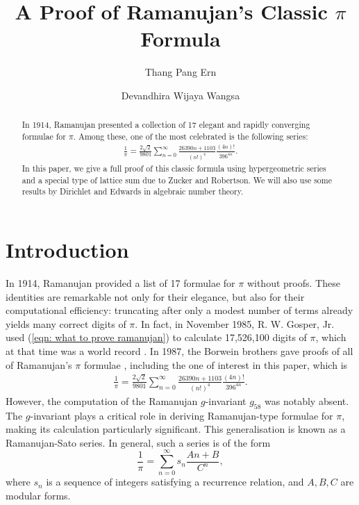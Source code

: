 \documentclass[11pt]{amsart}
\title[A Proof of Ramanujan's Classic $\pi$ Formula]%
 {A Proof of Ramanujan's Classic $\pi$ Formula}
\author{Thang Pang Ern \orcidlink{0009-0005-3447-4188}}
\author{Devandhira Wijaya Wangsa}
\theoremstyle{definition}
\numberwithin{theorem}{section}
\begin{document}
\maketitle
\begin{abstract}
In 1914, Ramanujan presented a collection of 17 elegant and rapidly converging formulae for $\pi$. Among these, one of the most celebrated is the following series: \begin{align*}
    \frac{1}{\pi}=\frac{2\sqrt{2}}{9801}\sum_{n=0}^{\infty}\frac{26390n+1103}{\left(n!\right)^4} \frac{\left(4n\right)!}{396^{4n}}.
\end{align*}
In this paper, we give a full proof of this classic formula using hypergeometric series and a special type of lattice sum due to Zucker and Robertson. We will also use some results by Dirichlet and Edwards in algebraic number theory.
\end{abstract}
\section{Introduction}
In 1914, Ramanujan provided a list of 17 formulae for $\pi$ \cite{ramanujan modular} without proofs. These identities are remarkable not only for their elegance, but also for their computational efficiency: truncating after only a modest number of terms already yields many correct digits of $\pi$. In fact, in November 1985, R. W. Gosper, Jr. used (\ref{eqn: what to prove ramanujan}) to calculate 17,526,100 digits of $\pi$, which at that time was a world record \cite{baruahberndtchan2009}. In 1987, the Borwein brothers gave proofs of all of Ramanujan's $\pi$ formulae \cite{pi and the agm, borwein pi proof 1987}, including the one of interest in this paper, which is \begin{align}\label{eqn: what to prove ramanujan}
\frac{1}{\pi}=\frac{2\sqrt{2}}{9801}\sum_{n=0}^{\infty}\frac{26390n+1103}{\left(n!\right)^4} \frac{\left(4n\right)!}{396^{4n}}.
\end{align} However, the computation of the Ramanujan \( g \)-invariant \( g_{58} \) was notably absent. The \(g\)-invariant plays a critical role in deriving Ramanujan-type formulae for \(\pi\), making its calculation particularly significant. This generalisation is known as a Ramanujan-Sato series. In general, such a series is of the form \[\frac{1}{\pi}=\sum_{n=0}^{\infty}s_n \frac{An+B}{C^n},\]
where $s_n$ is a sequence of integers satisfying a recurrence relation, and $A,B,C$ are modular forms.
\end{document}
